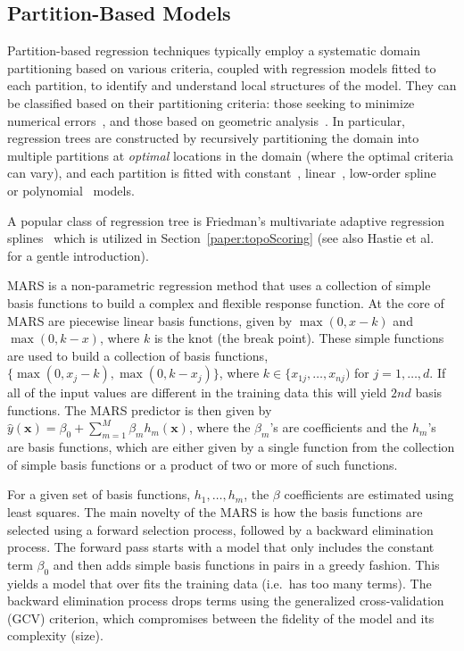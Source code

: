 \subsection{Partition-Based Models}
Partition-based regression techniques typically employ a systematic domain partitioning based on various criteria, coupled with regression models fitted to each partition, to identify and understand local structures of the model.
%
They can be classified based on their partitioning criteria: those seeking to minimize numerical errors~\cite{Friedman1991, AlexanderGrimshaw1996, BreimanFriedmanOlshen1984a, ChaudhuriHuangLoh1994, ChipmanMcCulloch2010}, and those based on geometric analysis~\cite{GerberPotter2012,GerberRubelBremer2011, LiLueChen2000}.
%
In particular, regression trees are constructed by recursively partitioning the domain into multiple partitions at \emph{optimal} locations in the domain (where the optimal criteria can vary), and each partition is fitted with constant~\cite{BreimanFriedmanOlshen1984a}, linear~\cite{AlexanderGrimshaw1996,LiLueChen2000}, low-order spline~\cite{Friedman1991} or polynomial~\cite{ChaudhuriHuangLoh1994} models.

A popular class of regression tree is Friedman's multivariate adaptive regression splines~\cite{Friedman1991} which is utilized in Section~\ref{paper:topoScoring} (see also Hastie et al.~\cite{HastieTibshiraniFriedman2008} for a gentle introduction).

MARS is a non-parametric regression method that uses a collection of simple basis functions to build a complex and flexible response function.
%
At the core of MARS are piecewise linear basis functions, given by $\max(0, x - k)$ and $\max(0, k - x)$, where $k$ is the knot (the break point).
%
These simple functions are used to build a collection of basis functions, $\{\max(0, x_j-k), \max(0,k-x_j)\}$, where $k \in \{x_{1j}, \dots, x_{nj})$ for $j = 1, \dots, d$.
%
If all of the input values are different in the training data this will yield $2nd$ basis functions. The MARS predictor is then given by $\hat{y}(\mathbf{x}) = \beta_0 + \sum_{m=1}^M \beta_m h_m(\mathbf{x})$, where the $\beta_m$'s are coefficients and the $h_m$'s are basis functions, which are either given by a single function from the collection of simple basis functions or a product of
two or more of such functions.

For a given set of basis functions, $h_1, \dots, h_m$, the $\beta$ coefficients are estimated using least squares.
%
The main novelty of the MARS is how the basis functions are selected using a forward selection process, followed by a backward elimination process.
%
The forward pass starts with a model that only includes the constant term $\beta_0$ and then adds simple basis functions in pairs in a greedy fashion.
%
This yields a model that over fits the training data (i.e.\ has too many terms).
%
The backward elimination process drops terms using the generalized cross-validation (GCV) criterion, which compromises between the fidelity of the model and its complexity (size).

